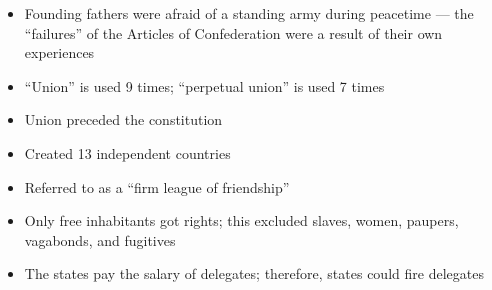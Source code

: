 \documentclass[12pt]{article}
\begin{document}
\begin{itemize}
\begin{itemize}
\begin{itemize}
        \end{itemize}

      \item Founding fathers were afraid of a standing army during peacetime — the “failures” of the Articles of Confederation were a result of their own experiences

      \item “Union” is used 9 times; “perpetual union” is used 7 times

      \item Union preceded the constitution

      \item Created 13 independent countries

      \item Referred to as a “firm league of friendship”

      \item Only free inhabitants got rights; this excluded slaves, women, paupers, vagabonds, and fugitives

      \item The states pay the salary of delegates; therefore, states could fire delegates

    \end{itemize}

\end{itemize}
\end{document}

